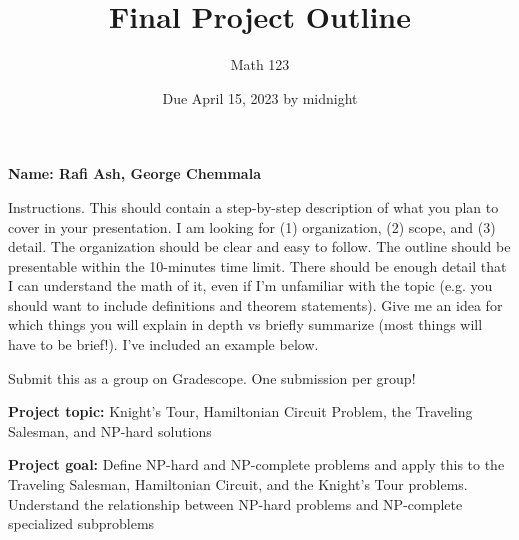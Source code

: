 \documentclass[11pt]{article}
\author{Math 123}
\date{Due April 15, 2023 by midnight}
\title{Final Project Outline}
\begin{document}
\maketitle

{\bf\Large Name: Rafi Ash, George Chemmala}

Instructions. This should contain a step-by-step description of what you plan to cover in your presentation. I am looking for (1) organization, (2) scope, and (3) detail. The organization should be clear and easy to follow. The outline should be presentable within the 10-minutes time limit. There should be enough detail that I can understand the math of it, even if I'm unfamiliar with the topic (e.g. you should want to include definitions and theorem statements). Give me an idea for which things you will explain in depth vs briefly summarize (most things will have to be brief!). I've included an example below.

Submit this as a group on Gradescope. One submission per group!

\textbf{Project topic:} Knight’s Tour, Hamiltonian Circuit Problem, the Traveling Salesman, and NP-hard solutions

\textbf{Project goal:} Define NP-hard and NP-complete problems and apply this to the Traveling Salesman, Hamiltonian Circuit, and the Knight’s Tour problems. Understand the relationship between NP-hard problems and NP-complete specialized subproblems 
\end{document}
